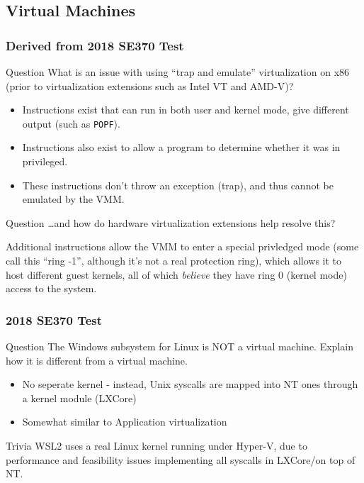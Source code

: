 \documentclass{beamer}
\begin{document}
\subsection{Virtual Machines}
\begin{frame}
  \frametitle{Derived from 2018 SE370 Test}
  \begin{block}{Question}
    What is an issue with using ``trap and emulate'' virtualization on x86 (prior to virtualization extensions such as Intel VT and AMD-V)?
  \end{block}
  \pause
  \begin{itemize}
    \item Instructions exist that can run in both user and kernel mode, give different output (such as \texttt{POPF}).
    \item Instructions also exist to allow a program to determine whether it was in privileged.
    \item These instructions don't throw an exception (trap), and thus cannot be emulated by the VMM.
  \end{itemize}
\end{frame}
\begin{frame}
  \begin{block}{Question}
    \dots and how do hardware virtualization extensions help resolve this?
  \end{block}
  \pause
  Additional instructions allow the VMM to enter a special privledged mode (some call this ``ring -1'', although it's not a real protection ring), which allows it to host different guest kernels, all of which \emph{believe} they have ring 0 (kernel mode) access to the system.
\end{frame}
\begin{frame}
  \frametitle{2018 SE370 Test}
  \begin{block}{Question}
    The Windows subsystem for Linux is NOT a virtual machine. Explain how it is different from a virtual machine.
  \end{block}
  \pause
  \begin{itemize}
    \item No seperate kernel - instead, Unix syscalls are mapped into NT ones through a kernel module (LXCore)
    \item Somewhat similar to Application virtualization
  \end{itemize}
  \begin{exampleblock}{Trivia}
    WSL2 uses a real Linux kernel running under Hyper-V, due to performance and feasibility issues implementing all syscalls in LXCore/on top of NT.
  \end{exampleblock}
\end{frame}
\end{document}

